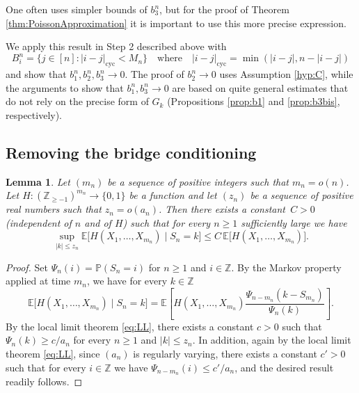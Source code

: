 \documentclass[a4paper,11pt]{article}
\newtheorem{lemma}[theorem]{Lemma}
\newcommand{\E}{\mathbb{E}}
\DeclareRobustCommand{\1}{\mathbf{1}}
\newcommand{\Z}{\mathbb{Z}}
\renewcommand\Pr[1]{\mathbb{P}\left(#1\right)}
\begin{document}
One often uses simpler bounds of $b^{n}_{3}$, but for the proof of Theorem \ref{thm:PoissonApproximation} it is important to use this more precise expression. 



We apply this result in Step 2 described above with
$$B_i^n=\{j\in[n]: |i-j|_{\mathrm{cyc}}<M_n\} \quad \textrm{where} \quad |i-j|_{\mathrm{cyc}}=\min(|i-j|,n-|i-j|)$$
and show that $b^{n}_{1}, b^{n}_{2}, b^{n}_{3} \rightarrow0$. The proof of $b^{n}_{2} \rightarrow 0$ uses Assumption \ref{hyp:C}, while the arguments to show that $b^{n}_{1}, b^{n}_{3} \rightarrow0$ are based on quite general estimates that do not rely on the precise form of $G_{k}$ (Propositions \ref{prop:b1} and \ref{prop:b3bis}, respectively). 








\subsection{Removing the bridge conditioning}

\begin{lemma}\label{lem:error_est}
Let $(m_{n})$ be a sequence of positive integers such that $m_{n}=o(n)$. Let $H : (\mathbb{Z}_{\geq -1})^{m_n} \to \{0,1\}$ be a function and let $(z_{n})$ be a sequence of positive real numbers such that $z_{n}=o(a_{n})$. Then there exists a constant~$C > 0$ (independent of $n$ and of $H$) such that for every $n \geq 1$ sufficiently large we have
\begin{equation}\label{eq:error_est}
  \sup_{|k| \leq z_{n}}\E\bigl[H(X_1,\ldots,X_{m_n}) \mid S_n = k\bigr] \leq C\, \E\bigl[H(X_1,\ldots,X_{m_n})\bigr].
\end{equation}
\end{lemma}

\begin{proof}
Set $\Psi_{n}(i)=\Pr{S_{n}=i}$ for $n \geq 1$ and $i \in \Z$. By the Markov property applied at time $m_{n}$, we have for every $k \in \Z$
$$
  \E\bigl[H(X_1,\ldots,X_{m_n}) \mid S_n = k\bigr]
  =
\E\left[H(X_1,\ldots,X_{m_n})   \frac{\Psi_{n-m_{n}}(k-S_{m_{n}})}{\Psi_{n}(k)}\right].
  $$
By the local limit theorem \eqref{eq:LL}, there exists a constant $c>0$ such that $\Psi_{n}(k) \geq c/a_{n}$ for every $n \geq 1$ and $|k| \leq z_{n}$. In addition, again by the local limit theorem  \eqref{eq:LL}, since $(a_{n})$ is regularly varying,  there exists a constant $c'>0$ such that for every $i \in \Z$ we have $\Psi_{n-m_{n}}(i) \leq c'/a_{n}$, and the desired result readily follows.
\end{proof}
\end{document}
